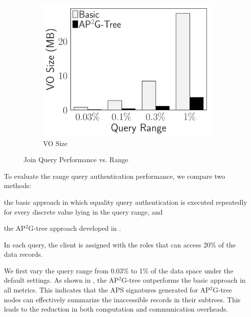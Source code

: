\begin{figure}[t]
\begin{subfigure}{.33\linewidth}
        \includegraphics[width=\linewidth]{exp-figs/access-control/join_vo.pdf}
        \caption{VO Size}
    \end{subfigure}
    \caption{Join Query Performance vs. Range}\label{exp-fig:access-control:join}
\end{figure}

To evaluate the range query authentication performance, we compare two methods:
\begin{inlineenum}
    \item the basic approach in which equality query authentication is executed repeatedly for every discrete value lying in the query range, and
    \item the AP$^2$G-tree approach developed in .
\end{inlineenum}
In each query, the client is assigned with the roles that can access 20\% of the data records.

We first vary the query range from 0.03\% to 1\% of the data space under the default settings. As shown in , the AP$^2$G-tree outperforms the basic approach in all metrics. This indicates that the APS signatures generated for AP$^2$G-tree nodes can effectively summarize the inaccessible records in their subtrees. This leads to the reduction in both computation and communication overheads.


